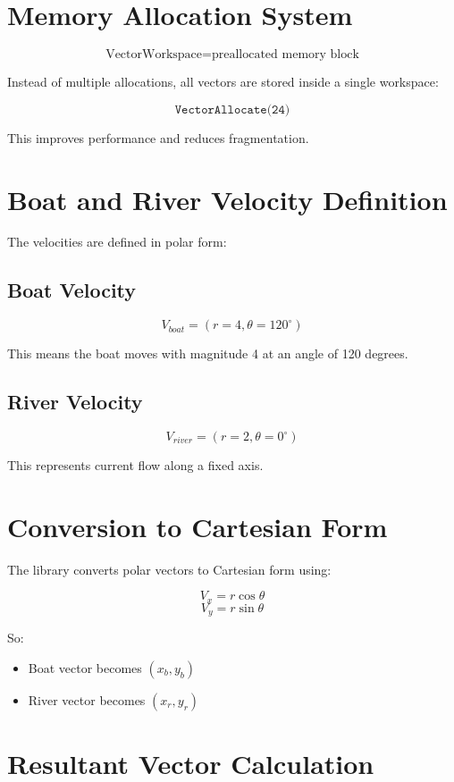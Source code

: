 \documentclass[12pt]{article}
\begin{document}
\section{Memory Allocation System}

\[
\text{VectorWorkspace} = \text{preallocated memory block}
\]

Instead of multiple allocations, all vectors are stored inside a single workspace:

\[
\texttt{VectorAllocate(24)}
\]

This improves performance and reduces fragmentation.

\section{Boat and River Velocity Definition}

The velocities are defined in polar form:

\subsection{Boat Velocity}

\[
V_{boat} = (r = 4, \theta = 120^\circ)
\]

This means the boat moves with magnitude 4 at an angle of 120 degrees.

\subsection{River Velocity}

\[
V_{river} = (r = 2, \theta = 0^\circ)
\]

This represents current flow along a fixed axis.

\section{Conversion to Cartesian Form}

The library converts polar vectors to Cartesian form using:

\[
V_x = r \cos\theta
\]
\[
V_y = r \sin\theta
\]

So:
\begin{itemize}
    \item Boat vector becomes $(x_b, y_b)$
    \item River vector becomes $(x_r, y_r)$
\end{itemize}

\section{Resultant Vector Calculation}
\end{document}
